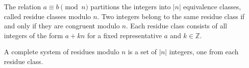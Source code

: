 The relation $a \equiv b \pmod{n}$ partitions the integers into $|n|$ equivalence classes, called residue classes modulo $n$. Two integers belong to the same residue class if and only if they are congruent modulo $n$. Each residue class consists of all integers of the form $a + kn$ for a fixed representative $a$ and $k \in \mathbb{Z}$.

A complete system of residues modulo $n$ is a set of $|n|$ integers, one from each residue class.
